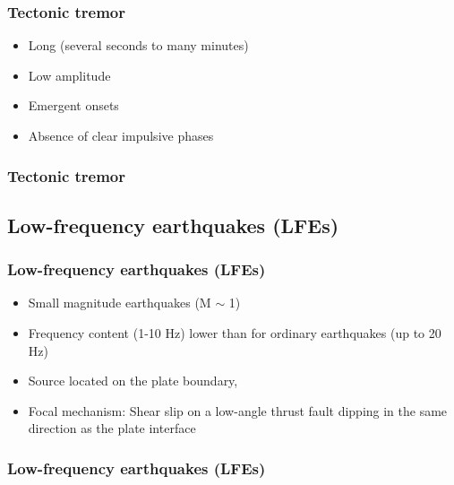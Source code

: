 \documentclass{beamer}
\begin{document}
	\begin{frame}
		\frametitle{Tectonic tremor}
		\begin{itemize}
			\item Long (several seconds to many minutes)
			\item Low amplitude
			\item Emergent onsets
			\item Absence of clear impulsive phases
		\end{itemize}
	\end{frame}

	\begin{frame}
		\frametitle{Tectonic tremor}
	\end{frame}


	\subsection{Low-frequency earthquakes (LFEs)}

	\begin{frame}
		\frametitle{Low-frequency earthquakes (LFEs)}
		\begin{itemize}
			\item Small magnitude earthquakes (M $\sim$ 1)
			\item Frequency content (1-10 Hz) lower than for ordinary earthquakes (up to 20 Hz)
			\item Source located on the plate boundary,
			\item Focal mechanism: Shear slip on a low-angle thrust fault dipping in the same direction as the plate interface
		\end{itemize}
	\end{frame}

	\begin{frame}
		\frametitle{Low-frequency earthquakes (LFEs)}
	\end{frame}

\end{document}

